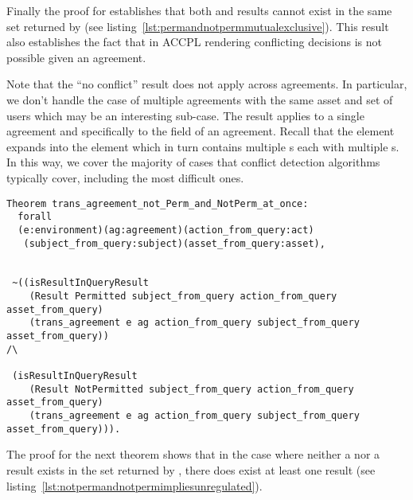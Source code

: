Finally the proof for  establishes that both  and  results cannot exist in the same set returned by  (see listing~\ref{lst:permandnotpermmutualexclusive}). This result also establishes the fact that in \ac{ACCPL} rendering conflicting decisions is not possible given an agreement. 

Note that the ``no conflict'' result does not apply across agreements. In particular, we don't handle the case of multiple agreements with the same asset and set of users which may be an interesting sub-case. The result applies to a single agreement and specifically to the  field of an agreement. Recall that the  element expands into the  element which in turn contains multiple s each with multiple s. In this way, we cover the majority of cases that conflict detection algorithms typically cover, including the most difficult ones.

\begin{lstlisting}
Theorem trans_agreement_not_Perm_and_NotPerm_at_once:
  forall
  (e:environment)(ag:agreement)(action_from_query:act)
   (subject_from_query:subject)(asset_from_query:asset),


 ~((isResultInQueryResult 
    (Result Permitted subject_from_query action_from_query asset_from_query)
    (trans_agreement e ag action_from_query subject_from_query asset_from_query)) 
/\

 (isResultInQueryResult 
    (Result NotPermitted subject_from_query action_from_query asset_from_query)
    (trans_agreement e ag action_from_query subject_from_query asset_from_query))).

\end{lstlisting}

The proof for the next theorem  shows that in the case where neither a  nor a  result exists in the set returned by , there does exist at least one  result (see listing~\ref{lst:notpermandnotpermimpliesunregulated}).

